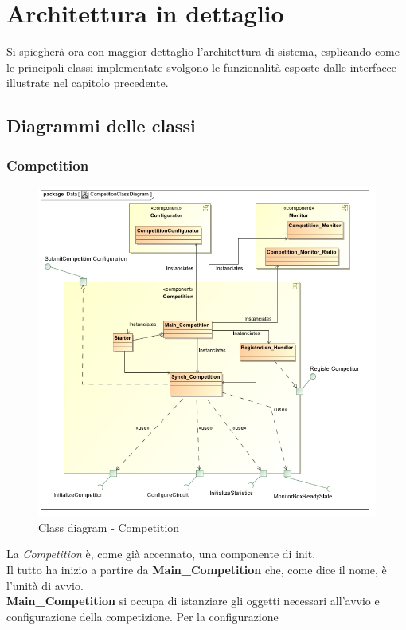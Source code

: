 \section{Architettura in dettaglio}
Si spiegher\`{a} ora con maggior dettaglio l'architettura di sistema, esplicando come le principali classi implementate svolgono le funzionalit\`{a}
esposte dalle interfacce illustrate nel capitolo precedente.
\subsection{Diagrammi delle classi}
\subsubsection{Competition}
\begin{center}
\begin{figure}[h!]
	\includegraphics[scale=0.50]{img/ClassDiagrams/CompetitionClassDiagram.jpg}
\caption{Class diagram - Competition}
\end{figure}
\end{center}
La \emph{Competition} \`{e}, come gi\`{a} accennato, una componente di init.\\
Il tutto ha inizio a partire da \textbf{Main\_Competition} che, come dice il nome, \`{e} l'unit\`{a} di avvio.\\
\textbf{Main\_Competition} si occupa di istanziare gli oggetti necessari all'avvio e configurazione della competizione. Per la configurazione
